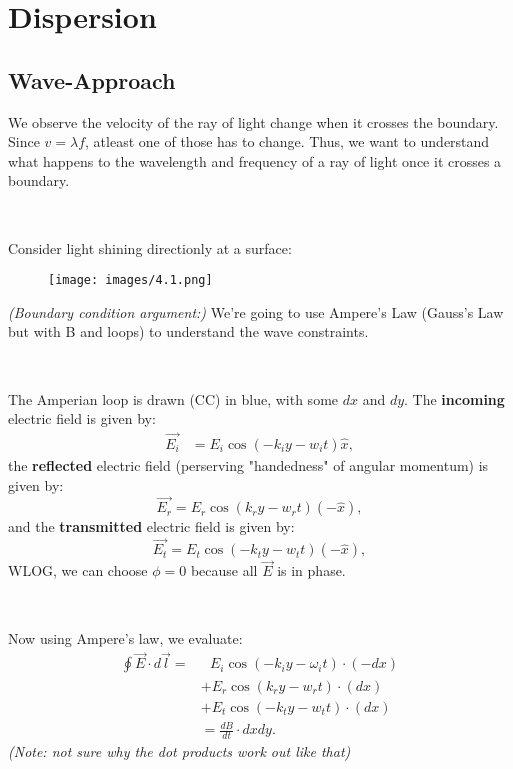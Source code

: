 \documentclass{article}
\begin{document}
\newpage

\hline
\section{Dispersion}
\subsection{Wave-Approach}

We observe the velocity of the ray of light change when it crosses the boundary. Since $v=\lambda f$, atleast one of those has to change. Thus, we want to understand what happens to the wavelength and frequency of a ray of light once it crosses a boundary.

\

Consider light shining directionly at a surface:

\begin{figure}[htp]
    \centering
    \texttt{[image: images/4.1.png]}
\end{figure}

\textit{(Boundary condition argument:) }We're going to use Ampere's Law (Gauss's Law but with B and loops) to understand the wave constraints. 

\

The Amperian loop is drawn (CC) in blue, with some $dx$ and $dy$. The \textbf{incoming} electric field is given by:
\begin{align*}
\overrightarrow{E_{i}} & =E_{i}\cos( -k_{i} y-w_{i} t)\hat{x} ,
\end{align*}
the \textbf{reflected} electric field (perserving "handedness" of angular momentum) is given by:
\begin{equation*}
\overrightarrow{E_{r}} =E_{r}\cos( k_{r} y-w_{r} t)\left( -\hat{x}\right) ,
\end{equation*}
and the \textbf{transmitted} electric field is given by:
\begin{equation*}
\overrightarrow{E_{t}} =E_{t}\cos( -k_{t} y-w_{t} t)\left( -\hat{x}\right) ,
\end{equation*}
WLOG, we can choose $\phi =0$ because all $\vec{E}$ is in phase. 

\

Now using Ampere's law, we evaluate:
\begin{align*}
\oint \vec{E} \cdot d\vec{l} = & \ \ \ E_{i}\cos( -k_{i} y-\omega _{i} t) \cdot ( -dx)\\
 & +E_{r}\cos( k_{r} y-w_{r} t) \cdot ( dx)\\
 & +E_{t}\cos( -k_{t} y-w_{t} t) \cdot ( dx)\\
 & =\tfrac{dB}{dt} \cdot dxdy.
\end{align*}
\textit{(Note: not sure why the dot products work out like that)}
\end{document}
